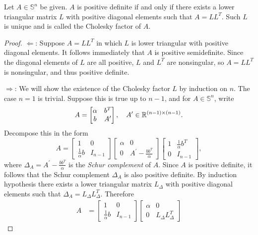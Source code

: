 \documentclass[12pt]{article}
\begin{document}
\begin{theorem}
    Let \(A\in\mathbb S^n\) be given. \(A\) is positive definite if and only if there exists a lower triangular matrix \(L\) with positive diagonal elements such that \(A=LL^T\). Such \(L\) is unique and is called the \textnormal{Cholesky factor} of \(A\).
\end{theorem}
\begin{proof}
    \(\Longleftarrow\): Suppose \(A=LL^T\) in which \(L\) is lower triangular with positive diagonal elements. It follows immediately that \(A\) is positive semidefinite. Since the diagonal elements of \(L\) are all positive, \(L\) and \(L^T\) are nonsingular, so \(A=LL^T\) is nonsingular, and thus positive definite.\par
    \(\Longrightarrow\): We will show the existence of the Cholesky factor \(L\) by induction on \(n\). The case \(n=1\) is trivial. Suppose this is true up to \(n-1\), and for \(A\in\mathbb S^n\), write
    \[A=\begin{bmatrix}
        \alpha & b^T \\ b & A^\prime
    \end{bmatrix},\quad A^\prime\in\mathbb R^{(n-1)\times(n-1)}.\]
    Decompose this in the form
    \[A=\begin{bmatrix}
        1 & 0 \\ \frac1\alpha b & I_{n-1}
    \end{bmatrix}\begin{bmatrix}
        \alpha & 0 \\ 0 & A^\prime-\frac{bb^T}{\alpha}
    \end{bmatrix}\begin{bmatrix}
        1 & \frac1\alpha b^T \\ 0 & I_{n-1}
    \end{bmatrix},\]
    where \(\Delta_A=A^\prime-\frac{bb^T}{\alpha}\) is the \textit{Schur complement} of \(A\). Since \(A\) is positive definite, it follows that the Schur complement \(\Delta_A\) is also positive definite. By induction hypothesis there exists a lower triangular matrix \(L_{\Delta}\) with positive diagonal elements such that \(\Delta_A=L_{\Delta}L_{\Delta}^T\). Therefore
    \[\begin{aligned}
        A &= \begin{bmatrix}
            1 &0 \\ \frac1\alpha b & I_{n-1}
        \end{bmatrix}\begin{bmatrix}
            \alpha & 0 \\ 0 & L_{\Delta}L_{\Delta}^T

\end{bmatrix}
\end{aligned}\]
\end{proof}
\end{document}
